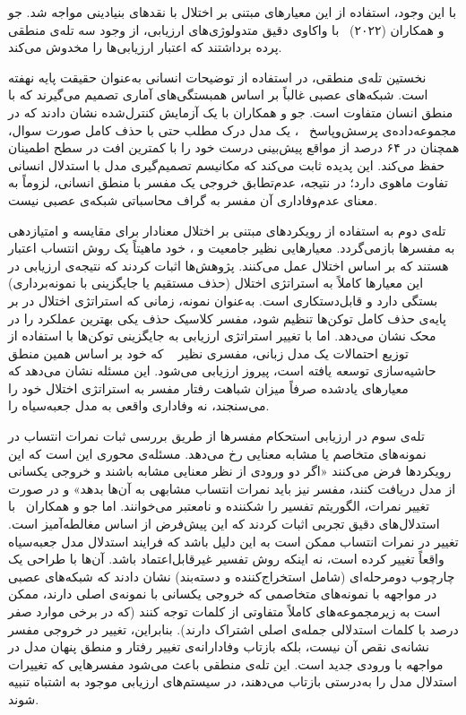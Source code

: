 با این وجود، استفاده از این معیارهای مبتنی بر اختلال با نقدهای بنیادینی مواجه شد. جو و همکاران (۲۰۲۲)~\cite{ju2022logictraps} با واکاوی دقیق متدولوژی‌های ارزیابی، از وجود سه تله‌ی منطقی پرده برداشتند که اعتبار ارزیابی‌ها را مخدوش می‌کند.

نخستین تله‌ی منطقی، در استفاده از توضیحات انسانی به‌عنوان حقیقت پایه نهفته است. شبکه‌های عصبی غالباً بر اساس همبستگی‌های آماری تصمیم می‌گیرند که با منطق انسان متفاوت است. جو و همکاران با یک آزمایش کنترل‌شده نشان دادند که در مجموعه‌داده‌ی پرسش‌وپاسخ ~\cite{lai2017race}، یک مدل درک مطلب حتی با حذف کامل صورت سوال، همچنان در ۶۴ درصد از مواقع پیش‌بینی درست خود را با کمترین افت در سطح اطمینان حفظ می‌کند. این پدیده ثابت می‌کند که مکانیسم تصمیم‌گیری مدل با استدلال انسانی تفاوت ماهوی دارد؛ در نتیجه، عدم‌تطابق خروجی یک مفسر با منطق انسانی، لزوماً به معنای عدم‌وفاداری آن مفسر به گراف محاسباتی شبکه‌ی عصبی نیست.

تله‌ی دوم به استفاده از رویکردهای مبتنی بر اختلال معنادار برای مقایسه و امتیازدهی به مفسرها بازمی‌گردد. معیارهایی نظیر جامعیت و ، خود ماهیتاً یک روش انتساب اعتبار هستند که بر اساس اختلال عمل می‌کنند. پژوهش‌ها اثبات کردند که نتیجه‌ی ارزیابی در این معیارها کاملاً به استراتژی اختلال (حذف مستقیم یا جایگزینی با نمونه‌برداری) بستگی دارد و قابل‌دستکاری است. به‌عنوان نمونه، زمانی که استراتژی اختلال در  بر پایه‌ی حذف کامل توکن‌ها تنظیم شود، مفسر کلاسیک حذف یکی بهترین عملکرد را در محک نشان می‌دهد. اما با تغییر استراتژی ارزیابی به جایگزینی توکن‌ها با استفاده از توزیع احتمالات یک مدل زبانی، مفسری نظیر ~\cite{kim2020interpretation} که خود بر اساس همین منطق حاشیه‌سازی توسعه یافته است، پیروز ارزیابی می‌شود. این مسئله نشان می‌دهد که معیارهای یادشده صرفاً میزان شباهت رفتار مفسر به استراتژی اختلال خود را می‌سنجند، نه وفاداری واقعی به مدل جعبه‌سیاه را.

تله‌ی سوم در ارزیابی استحکام مفسرها از طریق بررسی ثبات نمرات انتساب در نمونه‌های متخاصم یا مشابه معنایی رخ می‌دهد. مسئله‌ی محوری این است که این رویکردها فرض می‌کنند «اگر دو ورودی از نظر معنایی مشابه باشند و خروجی یکسانی از مدل دریافت کنند، مفسر نیز باید نمرات انتساب مشابهی به آن‌ها بدهد» و در صورت تغییر نمرات، الگوریتم تفسیر را شکننده و نامعتبر می‌خوانند. اما جو و همکاران~\cite{ju2022logictraps} با استدلال‌های دقیق تجربی اثبات کردند که این پیش‌فرض از اساس مغالطه‌آمیز است. تغییر در نمرات انتساب ممکن است به این دلیل باشد که فرایند استدلال مدل جعبه‌سیاه واقعاً تغییر کرده است، نه اینکه روش تفسیر غیرقابل‌اعتماد باشد. آن‌ها با طراحی یک چارچوب دومرحله‌ای (شامل استخراج‌کننده و دسته‌بند) نشان دادند که شبکه‌های عصبی در مواجهه با نمونه‌های متخاصمی که خروجی یکسانی با نمونه‌ی اصلی دارند، ممکن است به زیرمجموعه‌های کاملاً متفاوتی از کلمات توجه کنند (که در برخی موارد صفر درصد با کلمات استدلالی جمله‌ی اصلی اشتراک دارند). بنابراین، تغییر در خروجی مفسر نشانه‌ی نقص آن نیست، بلکه بازتاب وفادارانه‌ی تغییر رفتار و منطق پنهان مدل در مواجهه با ورودی جدید است. این تله‌ی منطقی باعث می‌شود مفسرهایی که تغییرات استدلال مدل را به‌درستی بازتاب می‌دهند، در سیستم‌های ارزیابی موجود به اشتباه تنبیه شوند.

